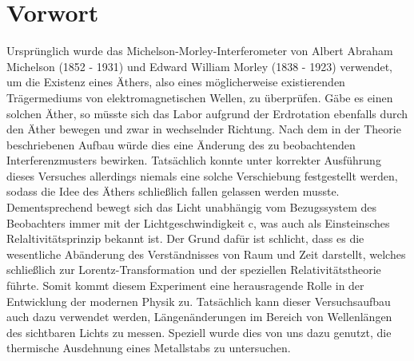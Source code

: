 \section{Vorwort}
Ursprünglich wurde das Michelson-Morley-Interferometer von Albert Abraham Michelson (1852 - 1931) und Edward William 
Morley (1838 - 1923) verwendet, um die Existenz eines Äthers, also eines möglicherweise existierenden Trägermediums von elektromagnetischen Wellen, 
zu überprüfen. Gäbe es einen solchen Äther, so müsste sich das Labor aufgrund der Erdrotation ebenfalls durch den Äther 
bewegen und zwar in wechselnder Richtung. Nach dem in der Theorie beschriebenen Aufbau würde dies eine Änderung des zu 
beobachtenden Interferenzmusters bewirken. Tatsächlich konnte unter korrekter Ausführung dieses Versuches allerdings 
niemals eine solche Verschiebung festgestellt werden, sodass die Idee des Äthers schließlich fallen gelassen werden 
musste. Dementsprechend bewegt sich das Licht unabhängig vom Bezugssystem des Beobachters immer mit der 
Lichtgeschwindigkeit c, was auch als Einsteinsches Relaltivitätsprinzip bekannt ist. Der Grund dafür ist schlicht, 
dass es die wesentliche Abänderung des Verständnisses von Raum und Zeit darstellt, welches schließlich zur 
Lorentz-Transformation und der speziellen Relativitätstheorie führte. Somit kommt diesem Experiment eine herausragende Rolle 
in der Entwicklung der modernen Physik zu. Tatsächlich kann dieser Versuchsaufbau auch dazu verwendet werden, 
Längenänderungen im Bereich von Wellenlängen des sichtbaren Lichts zu messen. Speziell wurde dies von uns dazu genutzt, 
die thermische Ausdehnung eines Metallstabs zu untersuchen. 
